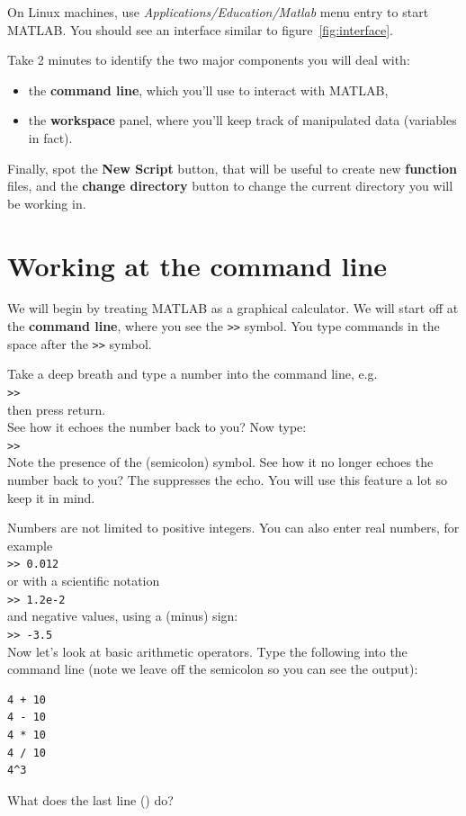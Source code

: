 \documentclass{article}
\begin{document}
On Linux machines, use \emph{Applications/Education/Matlab} menu entry to start MATLAB.
You should see an interface similar to figure~\ref{fig:interface}.

Take 2 minutes to identify the two major components you will deal with:
\begin{itemize}
\item the \textbf{command line}, which you'll use to interact with MATLAB,
\item the \textbf{workspace} panel, where you'll keep track of manipulated data (variables in fact).
\end{itemize}

Finally, spot the \textbf{New Script} button, that will be useful to create new \textbf{function} files,
and the \textbf{change directory} button to change the current directory you will be working in.


\section{Working at the command line}

We will begin by treating MATLAB as a graphical calculator.
We will start off at the \textbf{command line}, where you see the \verb|>>| symbol.
You type commands in the space after the \verb|>>| symbol.

Take a deep breath and type a number into the command line, e.g. \\
\verb|>>|  \\
then press return. \\
See how it echoes the number back to you? Now type: \\
\verb|>>|  \\
Note the presence of the \mcode{;} (semicolon) symbol.
See how it no longer echoes the number back to you?
The \mcode{;} suppresses the echo.
You will use this feature a lot so keep it in mind.

Numbers are not limited to positive integers.
You can also enter real numbers, for example \\
\verb|>> 0.012| \\
or with a scientific notation \\
\verb|>> 1.2e-2| \\
and negative values, using a \mcode{-} (minus) sign:\\
\verb|>> -3.5| \\

Now let's look at basic arithmetic operators.
Type the following into the command line (note we leave off the semicolon so you can see the output):
\begin{lstlisting}
4 + 10
4 - 10
4 * 10
4 / 10
4^3
\end{lstlisting}
What does the last line () do?
\end{document}
